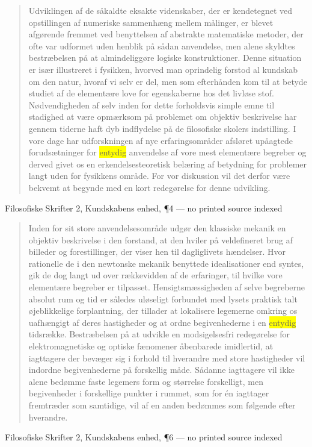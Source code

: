 \documentclass[11pt]{article}
\newcommand{\dcite}[1]{{\nopagebreak\raggedleft\small #1\par}\medskip}
\newcommand{\tlg}[1]{{\setlength{\fboxsep}{0.8pt}\colorbox{yellow}{#1}}}
\begin{document}
\begin{quote}
Udviklingen af de såkaldte eksakte videnskaber, der er kendetegnet ved opstillingen af numeriske sammenhæng mellem målinger, er blevet afgørende fremmet ved benyttelsen af abstrakte matematiske metoder, der ofte var udformet uden henblik på sådan anvendelse, men alene skyldtes bestræbelsen på at almindeliggøre logiske konstruktioner. Denne situation er især illustreret i fysikken, hvorved man oprindelig forstod al kundskab om den natur, hvoraf vi selv er del, men som efterhånden kom til at betyde studiet af de elementære love for egenskaberne hos det livløse stof. Nødvendigheden af selv inden for dette forholdsvis simple emne til stadighed at være opmærksom på problemet om objektiv beskrivelse har gennem tiderne haft dyb indflydelse på de filosofiske skolers indstilling. I vore dage har udforskningen af nye erfaringsområder afsløret upåagtede forudsætninger for \tlg{entydig} anvendelse af vore mest elementære begreber og derved givet os en erkendelsesteoretisk belæring af betydning for problemer langt uden for fysikkens område. For vor diskussion vil det derfor være bekvemt at begynde med en kort redegørelse for denne udvikling.
\end{quote}
\dcite{Filosofiske Skrifter 2, Kundskabens enhed, ¶4 — no printed source indexed}

\begin{quote}
Inden for sit store anvendelsesområde udgør den klassiske mekanik en objektiv beskrivelse i den forstand, at den hviler på veldefineret brug af billeder og forestillinger, der viser hen til dagliglivets hændelser. Hvor rationelle de i den newtonske mekanik benyttede idealisationer end syntes, gik de dog langt ud over rækkevidden af de erfaringer, til hvilke vore elementære begreber er tilpasset. Hensigtsmæssigheden af selve begreberne absolut rum og tid er således uløseligt forbundet med lysets praktisk talt øjeblikkelige forplantning, der tillader at lokalisere legemerne omkring os uafhængigt af deres hastigheder og at ordne begivenhederne i en \tlg{entydig} tidsrække. Bestræbelsen på at udvikle en modsigelsesfri redegørelse for elektromagnetiske og optiske fænomener åbenbarede imidlertid, at iagttagere der bevæger sig i forhold til hverandre med store hastigheder vil indordne begivenhederne på forskellig måde. Sådanne iagttagere vil ikke alene bedømme faste legemers form og størrelse forskelligt, men begivenheder i forskellige punkter i rummet, som for én iagttager fremtræder som samtidige, vil af en anden bedømmes som følgende efter hverandre.
\end{quote}
\dcite{Filosofiske Skrifter 2, Kundskabens enhed, ¶6 — no printed source indexed}
\end{document}
